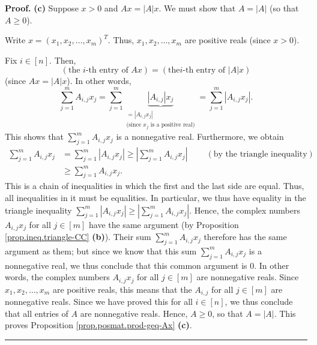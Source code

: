 \documentclass[numbers=enddot,12pt,final,onecolumn,notitlepage]{scrartcl}%
\numberwithin{exer}{subsection}
\theoremstyle{definition}
\newenvironment{proof}[1][Proof]{\noindent\textbf{#1.} }{\ \rule{0.5em}{0.5em}}
\let\sumnonlimits\sum
\renewcommand{\sum}{\sumnonlimits\limits}
\begin{document}
\begin{proof}
\textbf{(c)} Suppose $x>0$ and $Ax=\left\vert A\right\vert x$. We must show
that $A=\left\vert A\right\vert $ (so that $A\geq0$).

Write $x=\left(  x_{1},x_{2},\ldots,x_{m}\right)  ^{T}$. Thus, $x_{1}%
,x_{2},\ldots,x_{m}$ are positive reals (since $x>0$).

Fix $i\in\left[  n\right]  $. Then,%
\[
\left(  \text{the }i\text{-th entry of }Ax\right)  =\left(  \text{the
}i\text{-th entry of }\left\vert A\right\vert x\right)
\]
(since $Ax=\left\vert A\right\vert x$). In other words,%
\[
\sum_{j=1}^{m}A_{i,j}x_{j}=\sum_{j=1}^{m}\underbrace{\left\vert A_{i,j}%
\right\vert x_{j}}_{\substack{=\left\vert A_{i,j}x_{j}\right\vert
\\\text{(since }x_{j}\text{ is a positive real)}}}=\sum_{j=1}^{m}\left\vert
A_{i,j}x_{j}\right\vert .
\]
This shows that $\sum_{j=1}^{m}A_{i,j}x_{j}$ is a nonnegative real.
Furthermore, we obtain
\begin{align*}
\sum_{j=1}^{m}A_{i,j}x_{j} &  =\sum_{j=1}^{m}\left\vert A_{i,j}x_{j}%
\right\vert \geq\left\vert \sum_{j=1}^{m}A_{i,j}x_{j}\right\vert
\ \ \ \ \ \ \ \ \ \ \left(  \text{by the triangle inequality}\right)  \\
&  \geq\sum_{j=1}^{m}A_{i,j}x_{j}.
\end{align*}
This is a chain of inequalities in which the first and the last side are
equal. Thus, all inequalities in it must be equalities. In particular, we thus
have equality in the triangle inequality $\sum_{j=1}^{m}\left\vert
A_{i,j}x_{j}\right\vert \geq\left\vert \sum_{j=1}^{m}A_{i,j}x_{j}\right\vert
$. Hence, the complex numbers $A_{i,j}x_{j}$ for all $j\in\left[  m\right]  $
have the same argument (by Proposition \ref{prop.ineq.triangle-CC}
\textbf{(b)}). Their sum $\sum_{j=1}^{m}A_{i,j}x_{j}$ therefore has the same
argument as them; but since we know that this sum $\sum_{j=1}^{m}A_{i,j}x_{j}$
is a nonnegative real, we thus conclude that this common argument is $0$. In
other words, the complex numbers $A_{i,j}x_{j}$ for all $j\in\left[  m\right]
$ are nonnegative reals. Since $x_{1},x_{2},\ldots,x_{m}$ are positive reals,
this means that the $A_{i,j}$ for all $j\in\left[  m\right]  $ are nonnegative
reals. Since we have proved this for all $i\in\left[  n\right]  $, we thus
conclude that all entries of $A$ are nonnegative reals. Hence, $A\geq0$, so
that $A=\left\vert A\right\vert $. This proves Proposition
\ref{prop.posmat.prod-geq-Ax} \textbf{(c)}.
\end{proof}
\end{document}
